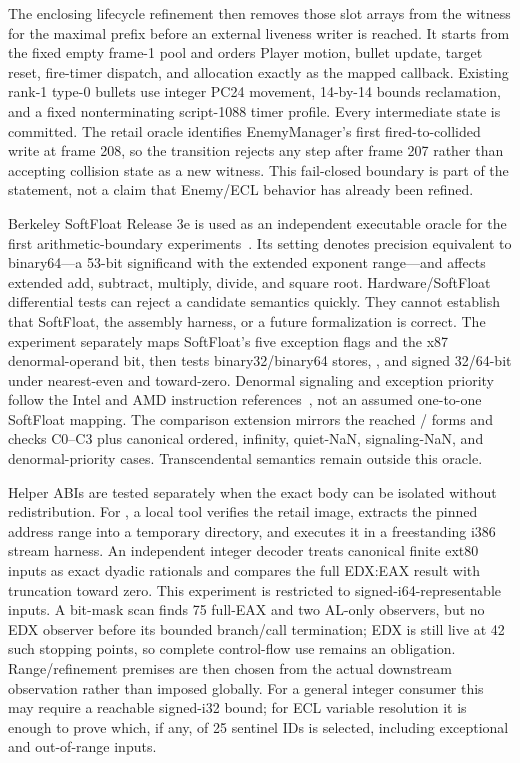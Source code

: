 The enclosing lifecycle refinement then removes those slot arrays from the
witness for the maximal prefix before an external liveness writer is reached.
It starts from the fixed empty frame-1 pool and orders Player motion, bullet
update, target reset, fire-timer dispatch, and allocation exactly as the
mapped callback.  Existing rank-1 type-0 bullets use integer PC24 movement,
14-by-14 bounds reclamation, and a fixed nonterminating script-1088 timer
profile.  Every intermediate state is committed.  The retail oracle identifies
EnemyManager's first fired-to-collided write at frame 208, so the transition
rejects any step after frame 207 rather than accepting collision state as a
new witness.  This fail-closed boundary is part of the statement, not a claim
that Enemy/ECL behavior has already been refined.

Berkeley SoftFloat Release 3e is used as an independent executable oracle for
the first arithmetic-boundary experiments~\cite{hauser-softfloat3e}.  Its
 setting denotes precision equivalent to
binary64---a 53-bit significand with the extended exponent range---and affects
extended add, subtract, multiply, divide, and square root.  Hardware/SoftFloat
differential tests can reject a candidate semantics quickly.  They cannot
establish that SoftFloat, the assembly harness, or a future formalization is
correct.  The experiment separately maps SoftFloat's five exception flags and
the x87 denormal-operand bit, then tests binary32/binary64 stores,
, and signed 32/64-bit  under nearest-even and
toward-zero.  Denormal signaling and exception priority follow the Intel and
AMD instruction references~\cite{intel-sdm-vol2a,amd-apm-vol5}, not an assumed
one-to-one SoftFloat mapping.  The comparison extension mirrors the reached
/ forms and checks C0--C3 plus canonical
ordered, infinity, quiet-NaN, signaling-NaN, and denormal-priority cases.
Transcendental semantics remain outside this oracle.

Helper ABIs are tested separately when the exact body can be isolated without
redistribution.  For , a local tool verifies the retail image,
extracts the pinned address range into a temporary directory, and executes it
in a freestanding i386 stream harness.  An independent integer decoder treats
canonical finite ext80 inputs as exact dyadic rationals and compares the full
EDX:EAX result with truncation toward zero.  This experiment is restricted to
signed-i64-representable inputs.  A bit-mask scan finds 75 full-EAX and two
AL-only observers, but no EDX observer before its bounded branch/call
termination; EDX is still live at 42 such stopping points, so complete
control-flow use remains an obligation.  Range/refinement premises are then
chosen from the actual downstream observation rather than imposed globally.
For a general integer consumer this may require a reachable signed-i32 bound;
for ECL variable resolution it is enough to prove which, if any, of 25
sentinel IDs is selected, including exceptional and out-of-range inputs.

